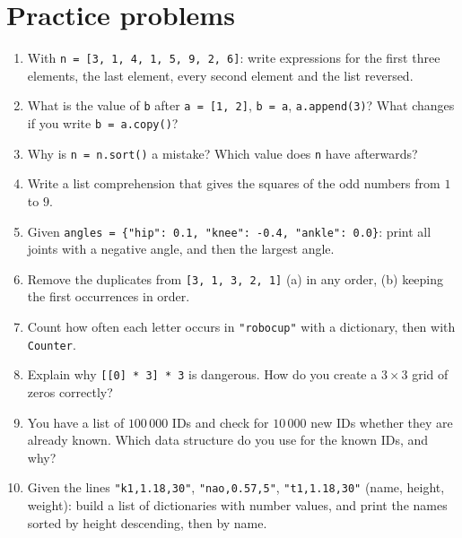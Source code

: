 \section*{Practice problems}
\begin{enumerate}[label=\textbf{\thechapter.\arabic*}]
  \item With \texttt{n = [3, 1, 4, 1, 5, 9, 2, 6]}: write expressions for the first three elements, the last element, every second element and the list reversed.
  \item What is the value of \texttt{b} after \verb!a = [1, 2]!, \verb!b = a!, \verb!a.append(3)!? What changes if you write \verb!b = a.copy()!?
  \item Why is \verb!n = n.sort()! a mistake? Which value does \texttt{n} have afterwards?
  \item Write a list comprehension that gives the squares of the odd numbers from $1$ to $9$.
  \item Given \texttt{angles = \{"hip": 0.1, "knee": -0.4, "ankle": 0.0\}}: print all joints with a negative angle, and then the largest angle.
  \item Remove the duplicates from \texttt{[3, 1, 3, 2, 1]} (a) in any order, (b) keeping the first occurrences in order.
  \item Count how often each letter occurs in \texttt{"robocup"} with a dictionary, then with \texttt{Counter}.
  \item Explain why \verb![[0] * 3] * 3! is dangerous. How do you create a $3\times3$ grid of zeros correctly?
  \item You have a list of $100\,000$ IDs and check for $10\,000$ new IDs whether they are already known. Which data structure do you use for the known IDs, and why?
  \item[\textbf{\thechapter.10}$\star$] Given the lines \texttt{"k1,1.18,30"}, \texttt{"nao,0.57,5"}, \texttt{"t1,1.18,30"} (name, height, weight): build a list of dictionaries with number values, and print the names sorted by height descending, then by name.
\end{enumerate}

